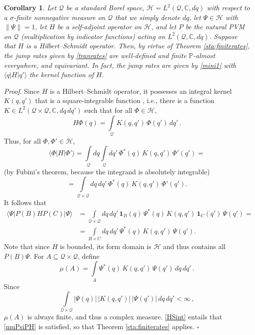 \documentclass[12pt]{article}
\newcommand{\CCC}{\mathbb{C}} %
\newcommand{\1}{\mathbf{1}} %
\newcommand{\Hilbert}{\mathscr{H}}
\renewcommand{\sp}[2]{\langle #1 | #2 \rangle} %
\newcommand{\conf}{\mathcal{Q}} %
\newcommand{\measure}{\mathbb{P}} %
\newcommand{\pov}{{P}}%
\newtheorem{corollary}{Corollary}
\newenvironment{proof}{\noindent 
\textit{Proof}.}{\hfill$\square$\bigskip}
\begin{document}
\begin{corollary}\label{sta:HSQC}
   Let $\conf$ be a standard Borel space, $\Hilbert = L^2 (\conf,
   \CCC, dq)$ with respect to a $\sigma$-finite nonnegative measure on
   $\conf$ that we simply denote $dq$, let $\Psi \in \Hilbert$ with
   $\|\Psi\| =1$, let $H$ be a self-adjoint operator on $\Hilbert$,
   and let $\pov$ be the natural PVM on $\conf$ (multiplication by
   indicator functions) acting on $L^2 (\conf, \CCC, dq)$. Suppose
   that $H$ is a Hilbert--Schmidt operator. Then, by virtue of Theorem
   \ref{sta:finiterates}, the jump rates given by \eqref{tranrates}
   are well-defined and finite $\measure$-almost everywhere, and
   equivariant. In fact, the jump rates are given by \eqref{mini1}
   with $\sp{q}{H|q'}$ the kernel function of $H$.
\end{corollary}

\begin{proof}
Since $H$ is a Hilbert--Schmidt operator, it possesses an integral
kernel $K(q,q')$ that is a square-integrable function
\cite[p.~210]{RS}, i.e., there is a function $K \in L^2(\conf \times
\conf, \CCC, dq \, dq')$ such that for all $\Phi \in \Hilbert$,
\[
   H\Phi(q) = \int\limits_{\conf} K(q,q') \, \Phi(q') \, dq'\,.
\]
Thus, for all $\Phi, \Phi' \in \Hilbert$,
\[
   \sp{\Phi}{H|\Phi'} = \int\limits_{\conf} dq \int\limits_{\conf} dq'
   \, \Phi^*(q) \, K(q,q') \, \Phi'(q') =
\]
(by Fubini's theorem, because the integrand is absolutely integrable)
\[
   = \int\limits_{\conf \times \conf} dq \, dq' \, \Phi^*(q) \, K(q,q')
   \, \Phi'(q').
\]
It follows that
\begin{subequations}\label{HSint}
\begin{align}
   \sp{\Psi}{\pov(B) H \pov(C) |\Psi} &= \int\limits_{\conf \times
   \conf} dq \, dq' \, \1_B(q) \, \Psi^*(q) \, K(q,q') \, \1_C(q') \,
   \Psi(q') =\\
   &= \int\limits_{B \times C} dq \, dq' \, \Psi^*(q) \,
   K(q,q') \, \Psi(q').
\end{align}
\end{subequations}
Note that since $H$ is bounded, its form domain is $\Hilbert$ and thus
contains all $\pov(B) \Psi$. For $A \subseteq \conf \times \conf$,
define
\[
   \mu(A) = \int\limits_A \Psi^*(q) \, K(q,q') \, \Psi(q') \, dq \, dq'
   \,.
\]
Since
\[
   \int\limits_{\conf \times \conf} |\Psi(q)| \, |K(q,q')| \,
   |\Psi(q')| \, dq \, dq' < \infty \,,
\]
$\mu(A)$ is always finite, and thus a complex measure.  \eqref{HSint}
entails that \eqref{muPsiPH} is satisfied, so that Theorem
\ref{sta:finiterates} applies.
\end{proof}
\end{document}
